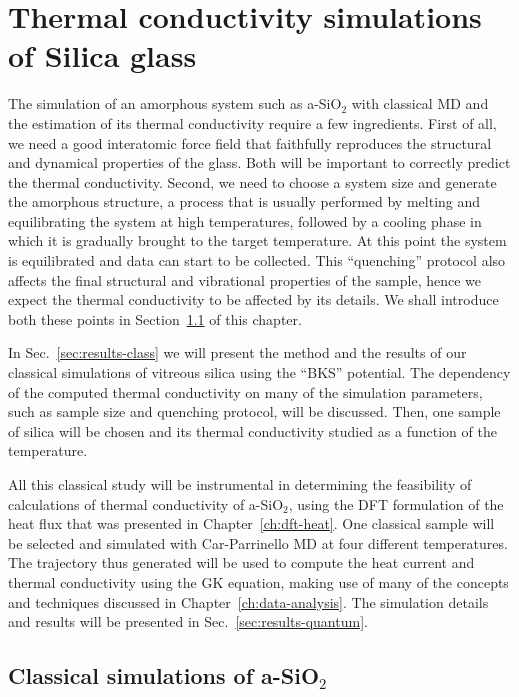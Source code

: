 \chapter{Thermal conductivity simulations of Silica glass}  \label{ch:silica}

The simulation of an amorphous system such as a-SiO$_2$ with classical MD and the estimation of its thermal conductivity require a few ingredients. 
First of all, we need a good interatomic force field that faithfully reproduces the structural and dynamical properties of the glass. Both will be important to correctly predict the thermal conductivity.
Second, we need to choose a system size and generate the amorphous structure, a process that is usually performed by melting and equilibrating the system at high temperatures, followed by a cooling phase in which it is gradually brought to the target temperature. At this point the system is equilibrated and data can start to be collected. This ``quenching'' protocol also affects the final structural and vibrational properties of the sample, hence we expect the thermal conductivity to be affected by its details. We shall introduce both these points in Section~\ref{sec:silica-classical} of this chapter. 

In Sec.~\ref{sec:results-class} we will present the method and the results of our classical simulations of vitreous silica using the ``BKS'' potential. The dependency of the computed thermal conductivity on many of the simulation parameters, such as sample size and quenching protocol, will be discussed.
Then, one  sample of silica will be chosen and its thermal conductivity studied as a function of the temperature. 

All this classical study will be instrumental in determining the feasibility of \abinitio calculations of thermal conductivity of a-SiO$_2$, using the DFT formulation of the heat flux that was presented in Chapter~\ref{ch:dft-heat}. One classical sample will be selected and simulated with Car-Parrinello MD at four different temperatures. The trajectory thus generated will be used to compute the \abinitio heat current and thermal conductivity using the GK equation, making use of many of the concepts and techniques discussed in Chapter~\ref{ch:data-analysis}. The simulation details and results will be presented in Sec.~\ref{sec:results-quantum}.


\section{Classical simulations of a-SiO$_2$}  \label{sec:silica-classical}

